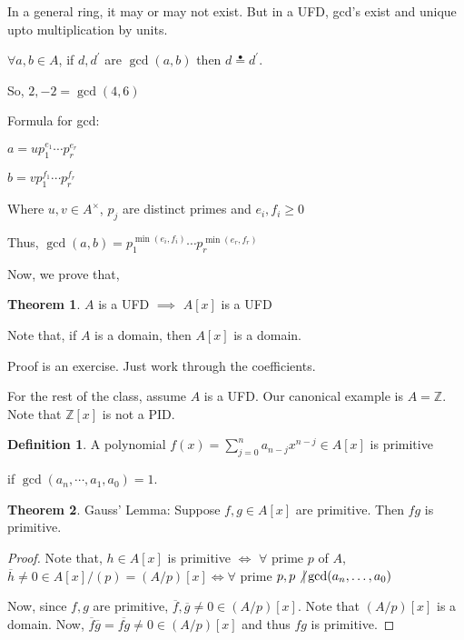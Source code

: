 \documentclass{article}
\theoremstyle{definition}
\newtheorem{definition}{Definition}
\newtheorem{theorem}{Theorem}
\begin{document}
In a general ring, it may or may not exist. But in a UFD, gcd's exist and unique upto multiplication by units.

\(\forall a,b \in A\), if \(d,d^{\prime}\) are \(\gcd(a,b)\) then \(d\overset{\bullet}{=} d^{\prime} \).

So, \(2,-2=\gcd(4,6)\) 

Formula for gcd:

\(a=u p_1^{e_1}\cdots p_r^{e_r}\)

\(b=v p_1^{f_1}\cdots p_r^{f_r}\) 

Where \(u,v\in A^\times \), \(p_j\) are distinct primes and \(e_i,f_i\geq 0\) 

Thus, \(\gcd(a,b)=p_1^{\min(e_i,f_i)}\cdots p_r^{\min(e_r,f_r)}\) 

Now, we prove that,

\begin{theorem}
    \(A\) is a UFD \(\implies \) \(A[x]\) is a UFD
\end{theorem}

Note that, if \(A\) is a domain, then \(A[x]\) is a domain.

Proof is an exercise. Just work through the coefficients.

For the rest of the class, assume \(A\) is a UFD. Our canonical example is \(A=\mathbb{Z}\). Note that \(\mathbb{Z} [x]\) is not a PID.

\begin{definition}
    A polynomial \(f(x)=\sum_{j=0}^{n} a_{n-j} x^{n-j} \in A[x]\) is primitive
    
    if \(\gcd(a_n,\cdots,a_1,a_0) = 1\). 
\end{definition}

\begin{theorem}
    Gauss' Lemma: Suppose \(f,g\in A[x]\) are primitive. Then \(fg\) is primitive.
\end{theorem}

\begin{proof}
    Note that, \(h\in A[x]\) is primitive \(\iff \) \(\forall \) prime \(p\) of \(A\), \(\overline{h} \neq 0\in A[x]/(p)=(A/p)[x] \iff \forall\) prime \(p, p \not\vert \gcd(a_n, \dots ,a_0)\) 
    
    Now, since \(f,g\) are primitive, \(\overline{f},\overline{g}  \neq 0 \in (A / p) [x]\). Note that \((A / p)[x]\) is a domain. Now, \(\overline{f} \overline{g} =\overline{fg} \neq 0 \in (A / p)[x]\) and thus \(fg\) is primitive.
    
\end{proof}
\end{document}
